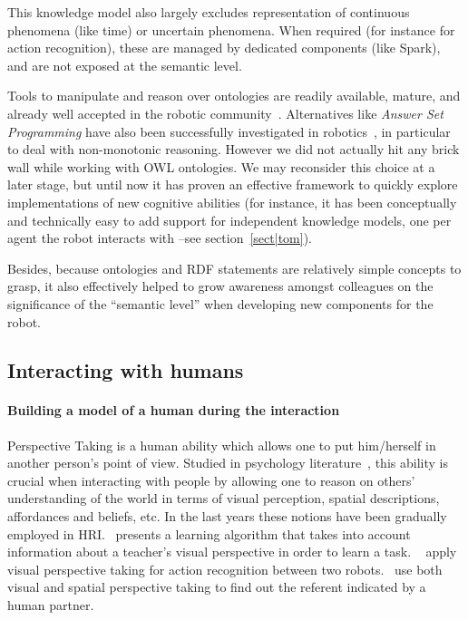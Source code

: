 \documentclass[preprint,3p,times]{elsarticle}
\begin{document}
This knowledge model also largely excludes representation of continuous
phenomena (like time) or uncertain phenomena. When required (for instance for
action recognition), these are managed by dedicated components (like {\sc
Spark}), and are not exposed at the semantic level.

Tools to manipulate and reason over ontologies are readily available, mature,
and already well accepted in the robotic community~\cite{Tenorth2009a,
Lim2011}. Alternatives like \emph{Answer Set Programming} have also been
successfully investigated in robotics~\cite{Chen2010,Erdem2012}, in particular
to deal with non-monotonic reasoning. However we did not actually hit any brick wall
while working with OWL ontologies. We may reconsider this choice at a later
stage, but until now it has proven an effective framework to quickly explore
implementations of new cognitive abilities (for instance, it has been
conceptually and technically easy to add support for independent knowledge
models, one per agent the robot interacts with --see section~\ref{sect|tom}).

Besides, because ontologies and RDF statements are relatively simple concepts
to grasp, it also effectively helped to grow awareness amongst colleagues on
the significance of the ``semantic level'' when developing new components for
the robot.

\subsection{Interacting with humans}

\paragraph{Building a model of a human during the interaction} Perspective
Taking is a human ability which allows one to put him/herself in another
person's point of view. Studied in psychology
literature~\cite{Flavell1992,Tversky1999}, this ability is crucial when
interacting with people by allowing one to reason on others' understanding of
the world in terms of visual perception, spatial descriptions, affordances and
beliefs, etc.  In the last years these notions have been gradually
employed in HRI.~\cite{Breazeal2006} presents a learning
algorithm that takes into account information about a teacher's visual
perspective in order to learn a task. ~\cite{Johnson2005} apply visual
perspective taking for action recognition between two
robots.~\cite{Trafton2005} use both visual and spatial perspective taking to
find out the referent indicated by a human partner.
\end{document}
